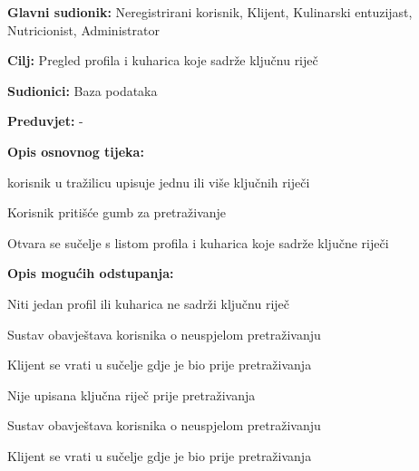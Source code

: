 					\noindent {}
					\begin{packed_item}
	
						\item \textbf{Glavni sudionik: }Neregistrirani korisnik, Klijent, Kulinarski entuzijast, Nutricionist, Administrator
						\item  \textbf{Cilj:} Pregled profila i kuharica koje sadrže ključnu riječ
						\item  \textbf{Sudionici:} Baza podataka
						\item  \textbf{Preduvjet:} -
						\item  \textbf{Opis osnovnog tijeka:} 
						
						\item[] \begin{packed_enum}
	
							\item korisnik u tražilicu upisuje jednu ili više ključnih riječi 
							\item Korisnik pritišće gumb za pretraživanje
							\item Otvara se sučelje s listom profila i kuharica koje sadrže ključne riječi
						\end{packed_enum}
						
						\item  \textbf{Opis mogućih odstupanja:}
						
						\item[] \begin{packed_item}
	
							\item[2.a] Niti jedan profil ili kuharica ne sadrži ključnu riječ
							\item[] \begin{packed_enum}
								
								\item Sustav obavještava korisnika o neuspjelom pretraživanju 
								\item Klijent se vrati u sučelje gdje je bio prije pretraživanja
								
							\end{packed_enum}

							\item[2.b] Nije upisana ključna riječ prije pretraživanja
							\item[] \begin{packed_enum}
								
								\item Sustav obavještava korisnika o neuspjelom pretraživanju 
								\item Klijent se vrati u sučelje gdje je bio prije pretraživanja
								
							\end{packed_enum}							
						\end{packed_item}
					\end{packed_item}



